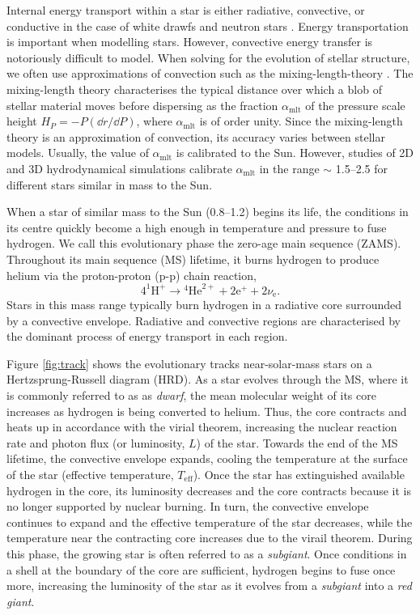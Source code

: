 Internal energy transport within a star is either radiative, convective, or conductive in the case of white drawfs and neutron stars \citep{Yakovlev.Urpin1980}. Energy transportation is important when modelling stars. However, convective energy transfer is notoriously difficult to model. When solving for the evolution of stellar structure, we often use approximations of convection such as the mixing-length-theory \citep{Bohm-Vitense1958, Gough1977}. The mixing-length theory characterises the typical distance over which a blob of stellar material moves before dispersing as the fraction $\alpha_\mathrm{mlt}$ of the pressure scale height $H_P = -P (\dd r / \dd P)$, where $\alpha_\mathrm{mlt}$ is of order unity. Since the mixing-length theory is an approximation of convection, its accuracy varies between stellar models. Usually, the value of $\alpha_\mathrm{mlt}$ is calibrated to the Sun. However, studies of 2D \citep{Ludwig.Freytag.ea1999} and 3D \citep{Trampedach.Stein.ea2014} hydrodynamical simulations calibrate $\alpha_\mathrm{mlt}$ in the range $\sim$ \numrange{1.5}{2.5} for different stars similar in mass to the Sun.

When a star of similar mass to the Sun (\SIrange{0.8}{1.2}{\solarmass}) begins its life, the conditions in its centre quickly become a high enough in temperature and pressure to fuse hydrogen. We call this evolutionary phase the zero-age main sequence (ZAMS). Throughout its main sequence (MS) lifetime, it burns hydrogen to produce helium via the proton-proton (p-p) chain reaction,
\begin{equation}
    4^{1} \mathrm{H}^{+} \rightarrow  {}^{4}\mathrm{He}^{2+}+2 \mathrm{e}^{+}+2 \nu_\mathrm{e}.
\end{equation}
Stars in this mass range typically burn hydrogen in a radiative core surrounded by a convective envelope. Radiative and convective regions are characterised by the dominant process of energy transport in each region.

Figure \ref{fig:track} shows the evolutionary tracks near-solar-mass stars on a Hertzsprung-Russell diagram (HRD). As a star evolves through the MS, where it is commonly referred to as as \emph{dwarf}, the mean molecular weight of its core increases as hydrogen is being converted to helium. Thus, the core contracts and heats up in accordance with the virial theorem, increasing the nuclear reaction rate and photon flux (or luminosity, $L$) of the star. Towards the end of the MS lifetime, the convective envelope expands, cooling the temperature at the surface of the star (effective temperature, $T_\mathrm{eff}$). Once the star has extinguished available hydrogen in the core, its luminosity decreases and the core contracts because it is no longer supported by nuclear burning. In turn, the convective envelope continues to expand and the effective temperature of the star decreases, while the temperature near the contracting core increases due to the virail theorem. During this phase, the growing star is often referred to as a \emph{subgiant}. Once conditions in a shell at the boundary of the core are sufficient, hydrogen begins to fuse once more, increasing the luminosity of the star as it evolves from a \emph{subgiant} into a \emph{red giant}.

